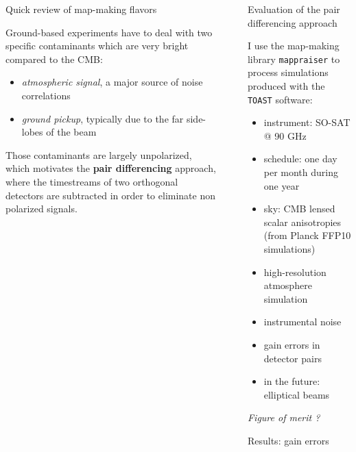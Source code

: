 \documentclass[final]{beamer}
\newlength{\sepwidth}
\newlength{\colwidth}
\newcommand{\separatorcolumn}{\begin{column}{\sepwidth}\end{column}}
\begin{document}
\begin{frame}[t]
\begin{columns}[t]
\begin{column}{\colwidth}
\begin{alertblock}{Quick review of map-making flavors}

        Ground-based experiments have to deal with two specific contaminants which are very bright compared to the CMB:

        \begin{itemize}
          \item \emph{atmospheric signal}, a major source of noise correlations
          \item \emph{ground pickup}, typically due to the far side-lobes of the beam
        \end{itemize}

        Those contaminants are largely unpolarized, which motivates the \textbf{pair differencing} approach, where the timestreams of two orthogonal detectors are subtracted in order to eliminate non polarized signals.

      \end{alertblock}

    \end{column}

    \separatorcolumn

    \begin{column}{\colwidth}

      \begin{block}{Evaluation of the pair differencing approach}

        I use the map-making library \texttt{mappraiser}\cite{ElBouhargani:2021umq} to process simulations produced with the \texttt{TOAST} software:
        \begin{itemize}
          \item instrument: SO-SAT @ 90 GHz
          \item schedule: one day per month during one year
          \item sky: CMB lensed scalar anisotropies (from Planck FFP10 simulations)
          \item high-resolution atmosphere simulation
          \item instrumental noise
          \item gain errors in detector pairs
          \item in the future: elliptical beams
        \end{itemize}

        \emph{Figure of merit ?}

      \end{block}

      \begin{block}{Results: gain errors}


\end{block}
\end{column}
\end{columns}
\end{frame}
\end{document}
